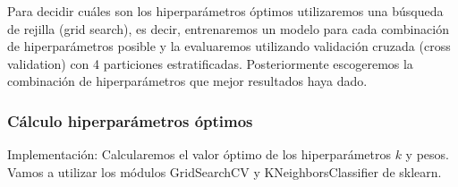 \documentclass[11pt]{article}
\begin{document}
Para decidir cuáles son los hiperparámetros óptimos utilizaremos una
búsqueda de rejilla (grid search), es decir, entrenaremos un modelo para
cada combinación de hiperparámetros posible y la evaluaremos utilizando
validación cruzada (cross validation) con 4 particiones estratificadas.
Posteriormente escogeremos la combinación de hiperparámetros que mejor
resultados haya dado.

    \hypertarget{cuxe1lculo-hiperparuxe1metros-uxf3ptimos}{%
\subsubsection{Cálculo hiperparámetros
óptimos}\label{cuxe1lculo-hiperparuxe1metros-uxf3ptimos}}

Implementación: Calcularemos el valor óptimo de los hiperparámetros
\(k\) y pesos. Vamos a utilizar los módulos GridSearchCV y
KNeighborsClassifier de sklearn.
\end{document}
